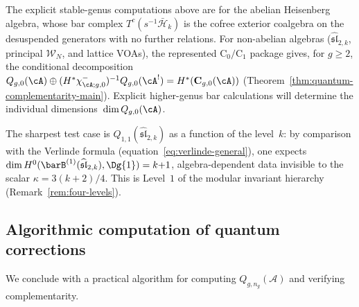 \begin{remark}%
\label{rem:nonabelian-Qg-open}%
%
The explicit stable-genus computations above are for the abelian
Heisenberg algebra, whose bar complex
$T^c(s^{-1}\bar{\mathcal H}_k)$ is the cofree exterior coalgebra
on the desuspended generators with no further relations. For
non-abelian algebras ($\widehat{\mathfrak{sl}}_{2,k}$,
principal $\mathcal{W}_N$, and lattice VOAs), the
represented \(\mathrm C_0/\mathrm C_1\) package gives, for $g\geq2$,
the conditional decomposition
$Q_{g,0}(\cA)\oplus
(H^*\chi^-_{\cA;g,0})^{-1}Q_{g,0}(\cA^!)
=H^*(\mathbf C_{g,0}(\cA))$
(Theorem~\ref{thm:quantum-complementarity-main}).  Explicit
higher-genus bar calculations will determine the individual
dimensions~$\dim Q_{g,0}(\cA)$.

The sharpest test case is $Q_{1,1}(\widehat{\mathfrak{sl}}_{2,k})$
as a function of the level~$k$: by comparison with the Verlinde
formula (equation~\eqref{eq:verlinde-general}), one expects
$\dim H^0(\barB^{(1)}(\widehat{\mathfrak{sl}}_{2,k}), \Dg{1})
= k{+}1$, algebra-dependent data invisible to the scalar
$\kappa = 3(k{+}2)/4$. This is Level~$1$ of the modular
invariant hierarchy (Remark~\ref{rem:four-levels}).
\end{remark}

\subsection{Algorithmic computation of quantum corrections}

We conclude with a practical algorithm for computing $Q_{g,n_g}(\mathcal{A})$ and verifying
complementarity.

